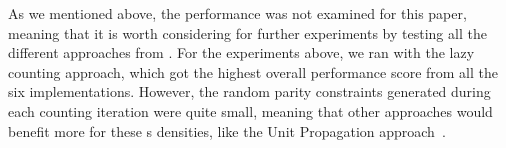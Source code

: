 As we mentioned above, the performance was not examined for this paper,
meaning that it is worth considering for further experiments by testing all the different approaches from \xorro{}.
For the experiments above, we ran \xorro{} with the lazy counting approach,
which got the highest overall performance score from all the six implementations.
However, the random parity constraints generated during each counting iteration were quite small,
meaning that other approaches would benefit more for these \XOR{}s densities, like the Unit Propagation approach~\cite{DBLP:conf/lpnmr/EverardoJKS19}.
